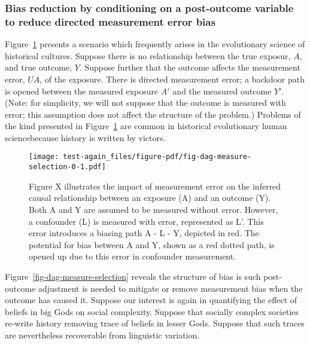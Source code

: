 \documentclass[
  singlecolumn]{article}
\begin{document}
\hypertarget{bias-reduction-by-conditioning-on-a-post-outcome-variable-to-reduce-directed-measurement-error-bias}{%
\subsubsection{Bias reduction by conditioning on a post-outcome variable
to reduce directed measurement error
bias}\label{bias-reduction-by-conditioning-on-a-post-outcome-variable-to-reduce-directed-measurement-error-bias}}

Figure~\ref{fig-dag-measure-selection-0} presents a scenario which
frequently arises in the evolutionary science of historical cultures.
Suppose there is no relationship between the true exposur, \(A\), and
true outcome, \(Y\). Suppose further that the outcome affects the
measurement error, \(UA\), of the exposure. There is directed
measurement error; a backdoor path is opened between the measured
exposure \(A'\) and the measured outcome \(Y'\). (Note: for simplicity,
we will not suppose that the outcome is measured with error; this
assumption does not affect the structure of the problem.) Problems of
the kind presented in Figure~\ref{fig-dag-measure-selection-0} are
common in historical evolutionary human sciencebecause history is
written by victors.

\begin{figure}

{\centering \texttt{[image: test-again\_files/figure-pdf/fig-dag-measure-selection-0-1.pdf]}

}

\caption{\label{fig-dag-measure-selection-0}Figure X illustrates the
impact of measurement error on the inferred causal relationship between
an exposure (A) and an outcome (Y). Both A and Y are assumed to be
measured without error. However, a confounder (L) is measured with
error, represented as L'. This error introduces a biasing path A - L -
Y, depicted in red. The potential for bias between A and Y, shown as a
red dotted path, is opened up due to this error in confounder
measurement.}

\end{figure}

Figure~\ref{fig-dag-measure-selection} reveals the structure of bias is
such post-outcome adjustment is needed to mitigate or remove measurement
bias when the outcome has caused it. Suppose our interest is again in
quantifying the effect of beliefs in big Gods on social complexity.
Suppose that socially complex societies re-write history removing trace
of beliefs in lesser Gods. Suppose that such traces are nevertheless
recoverable from linguistic variation.
\end{document}
